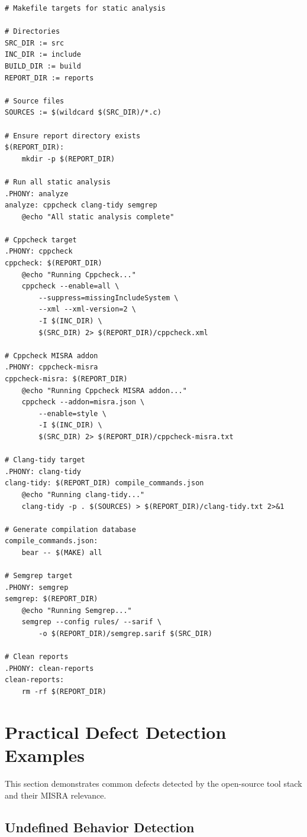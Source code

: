 \documentclass[11pt,letterpaper]{report}
\begin{document}
\begin{lstlisting}[style=bashstyle]
# Makefile targets for static analysis

# Directories
SRC_DIR := src
INC_DIR := include
BUILD_DIR := build
REPORT_DIR := reports

# Source files
SOURCES := $(wildcard $(SRC_DIR)/*.c)

# Ensure report directory exists
$(REPORT_DIR):
	mkdir -p $(REPORT_DIR)

# Run all static analysis
.PHONY: analyze
analyze: cppcheck clang-tidy semgrep
	@echo "All static analysis complete"

# Cppcheck target
.PHONY: cppcheck
cppcheck: $(REPORT_DIR)
	@echo "Running Cppcheck..."
	cppcheck --enable=all \
		--suppress=missingIncludeSystem \
		--xml --xml-version=2 \
		-I $(INC_DIR) \
		$(SRC_DIR) 2> $(REPORT_DIR)/cppcheck.xml

# Cppcheck MISRA addon
.PHONY: cppcheck-misra
cppcheck-misra: $(REPORT_DIR)
	@echo "Running Cppcheck MISRA addon..."
	cppcheck --addon=misra.json \
		--enable=style \
		-I $(INC_DIR) \
		$(SRC_DIR) 2> $(REPORT_DIR)/cppcheck-misra.txt

# Clang-tidy target
.PHONY: clang-tidy
clang-tidy: $(REPORT_DIR) compile_commands.json
	@echo "Running clang-tidy..."
	clang-tidy -p . $(SOURCES) > $(REPORT_DIR)/clang-tidy.txt 2>&1

# Generate compilation database
compile_commands.json:
	bear -- $(MAKE) all

# Semgrep target
.PHONY: semgrep
semgrep: $(REPORT_DIR)
	@echo "Running Semgrep..."
	semgrep --config rules/ --sarif \
		-o $(REPORT_DIR)/semgrep.sarif $(SRC_DIR)

# Clean reports
.PHONY: clean-reports
clean-reports:
	rm -rf $(REPORT_DIR)
\end{lstlisting}

\chapter{Practical Defect Detection Examples}

This section demonstrates common defects detected by the open-source tool stack and their MISRA relevance.

\section{Undefined Behavior Detection}
\end{document}
